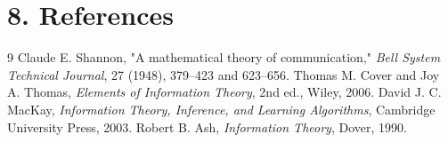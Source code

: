 \section*{8. References}

\begin{thebibliography}{9}
 Claude E. Shannon, "A mathematical theory of communication," \emph{Bell System Technical Journal}, 27 (1948), 379--423 and 623--656.
 Thomas M. Cover and Joy A. Thomas, \emph{Elements of Information Theory}, 2nd ed., Wiley, 2006.
 David J. C. MacKay, \emph{Information Theory, Inference, and Learning Algorithms}, Cambridge University Press, 2003.
 Robert B. Ash, \emph{Information Theory}, Dover, 1990.
\end{thebibliography}
